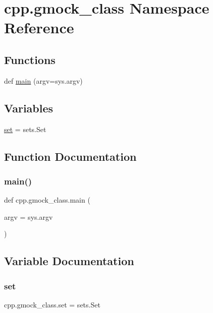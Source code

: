 \hypertarget{namespacecpp_1_1gmock__class}{}\section{cpp.\+gmock\+\_\+class Namespace Reference}
\label{namespacecpp_1_1gmock__class}
\subsection*{Functions}
\begin{DoxyCompactItemize}
\item 
def \mbox{\hyperlink{namespacecpp_1_1gmock__class_a8f99cfdd2b4f0a547d6585b1de78bac0}{main}} (argv=sys.\+argv)
\end{DoxyCompactItemize}
\subsection*{Variables}
\begin{DoxyCompactItemize}
\item 
\mbox{\hyperlink{namespacecpp_1_1gmock__class_a2157e96eee0b4bf9ca6d195ab76f59c2}{set}} = sets.\+Set
\end{DoxyCompactItemize}


\subsection{Function Documentation}
\mbox{\label{namespacecpp_1_1gmock__class_a8f99cfdd2b4f0a547d6585b1de78bac0}} 
\subsubsection{\texorpdfstring{main()}{main()}}
{\footnotesize\ttfamily def cpp.\+gmock\+\_\+class.\+main (\begin{DoxyParamCaption}\item[{}]{argv = {\ttfamily sys.argv} }\end{DoxyParamCaption})}



\subsection{Variable Documentation}
\mbox{\label{namespacecpp_1_1gmock__class_a2157e96eee0b4bf9ca6d195ab76f59c2}} 
\subsubsection{\texorpdfstring{set}{set}}
{\footnotesize\ttfamily cpp.\+gmock\+\_\+class.\+set = sets.\+Set}


